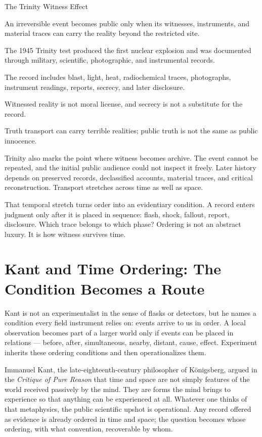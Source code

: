\begin{phenom}{The Trinity Witness Effect~\cite{smyth1945}}
\label{ph:trinity-witness}

\PhStatement
An irreversible event becomes public only when its witnesses, instruments, and
material traces can carry the reality beyond the restricted site.

\PhOrigin
The 1945 Trinity test produced the first nuclear explosion and was documented
through military, scientific, photographic, and instrumental records.

\PhObservation
The record includes blast, light, heat, radiochemical traces, photographs,
instrument readings, reports, secrecy, and later disclosure.

\PhConstraint
Witnessed reality is not moral license, and secrecy is not a substitute for
the record.

\PhConsequence
Truth transport can carry terrible realities; public truth is not the same as
public innocence.
\end{phenom}

Trinity also marks the point where witness becomes archive. The event
cannot be repeated, and the initial public audience could not inspect it
freely. Later history depends on preserved records, declassified
accounts, material traces, and critical reconstruction. Transport
stretches across time as well as space.

That temporal stretch turns order into an evidentiary condition. A
record enters judgment only after it is placed in sequence: flash,
shock, fallout, report, disclosure. Which trace belongs to which phase?
Ordering is not an abstract luxury. It is how witness survives time.

\section{Kant and Time Ordering: The Condition Becomes a Route}

Kant is not an experimentalist in the sense of flasks or detectors, but he
names a condition every field instrument relies on: events arrive to us in
order. A local observation becomes part of a larger world only if events
can be placed in relations --- before, after, simultaneous, nearby,
distant, cause, effect. Experiment inherits these ordering conditions and
then operationalizes them.

Immanuel Kant, the late-eighteenth-century philosopher of K\"onigsberg,
argued in the \emph{Critique of Pure Reason} that time and space are not
simply features of the world received passively by the mind. They are forms the
mind brings to experience so that anything can be experienced at all.
Whatever one thinks of that metaphysics, the public scientific upshot is
operational. Any record offered as evidence is already ordered in time
and space; the question becomes whose ordering, with what convention,
recoverable by whom.

